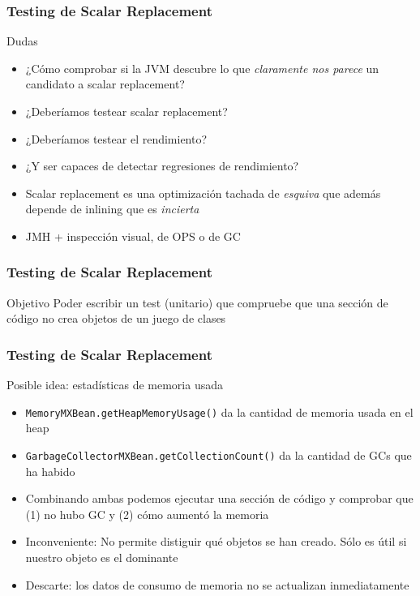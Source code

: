 
\def\ft{Testing de Scalar Replacement}

\begin{frame}[fragile]
  \frametitle{\ft}
  \begin{block}{Dudas}
    \begin{itemize}
    \item ¿Cómo comprobar si la JVM descubre lo que {\it claramente nos parece}
      un candidato a scalar replacement?
    \item ¿Deberíamos testear scalar replacement?
    \item ¿Deberíamos testear el rendimiento?
    \item ¿Y ser capaces de detectar regresiones de rendimiento?
    \item Scalar replacement es una optimización tachada de {\it esquiva}
      que además depende de inlining que es {\it incierta}
    \item JMH + inspección visual, de OPS o de GC
    \end{itemize}
  \end{block}
\end{frame}

\begin{frame}[fragile]
  \frametitle{\ft}
  \begin{block}{Objetivo}
    Poder escribir un test (unitario) que compruebe
    que una sección de código no crea objetos de un juego de clases
  \end{block}
\end{frame}


\begin{frame}[fragile]
  \frametitle{\ft}
  \begin{block}{Posible idea: estadísticas de memoria usada}
    \begin{itemize}
    \item {\tt MemoryMXBean.getHeapMemoryUsage()}
      da la cantidad de memoria usada en el heap
    \item {\tt GarbageCollectorMXBean.getCollectionCount()}
      da la cantidad de GCs que ha habido
    \item Combinando ambas podemos ejecutar una sección de código
      y comprobar que (1) no hubo GC y (2) cómo aumentó la memoria
    \item Inconveniente:
      No permite distiguir qué objetos se han creado. Sólo es útil
      si nuestro objeto es el dominante
    \item Descarte:
      los datos de consumo de memoria no se actualizan inmediatamente
    \end{itemize}
  \end{block}
\end{frame}


